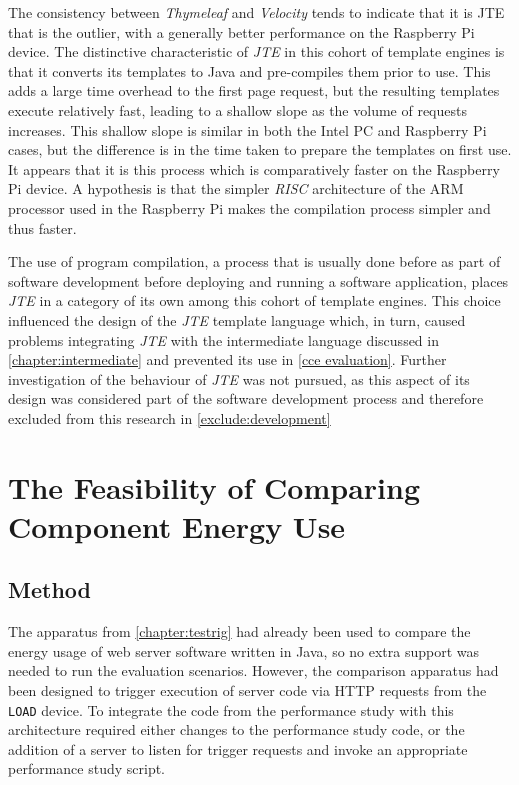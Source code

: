 The consistency between \emph{Thymeleaf} and \emph{Velocity} tends to indicate that it is JTE that is the outlier, with a generally better performance on the Raspberry Pi device. The distinctive characteristic of \emph{JTE} in this cohort of \gls{template engine}s is that it converts its templates to Java and pre-compiles them prior to use. This adds a large time overhead to the first page request, but the resulting templates execute relatively fast, leading to a shallow slope as the volume of requests increases. This shallow slope is similar in both the Intel PC and Raspberry Pi cases, but the difference is in the time taken to prepare the templates on first use. It appears that it is this process which is comparatively faster on the Raspberry Pi device. A hypothesis is that the simpler \emph{RISC} architecture of the ARM processor used in the Raspberry Pi makes the compilation process simpler and thus faster.

The use of program compilation, a process that is usually done before as part of software development before deploying and running a software application, places \emph{JTE} in a category of its own among this cohort of \gls{template engine}s. This choice influenced the design of the \emph{JTE} \gls{template language} which, in turn, caused problems integrating \emph{JTE} with the intermediate language discussed in \autoref{chapter:intermediate} and prevented its use in \autoref{cce evaluation}. Further investigation of the behaviour of \emph{JTE} was not pursued, as this aspect of its design was considered part of the software development process and therefore excluded from this research in \autoref{exclude:development}


\section{The Feasibility of Comparing Component Energy Use}
\label{section:fse}

\subsection{Method}
\label{fse methodology}

The apparatus from \autoref{chapter:testrig} had already been used to compare the energy usage of web server software written in Java, so no extra support was needed to run the evaluation scenarios. However, the comparison apparatus had been designed to trigger execution of server code via HTTP requests from the \texttt{LOAD} device. To integrate the code from the performance study with this architecture required either changes to the performance study code, or the addition of a server to listen for trigger requests and invoke an appropriate performance study script.

